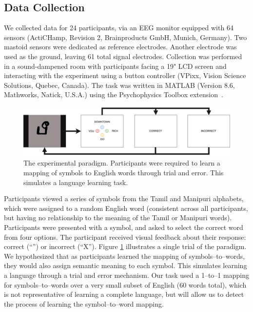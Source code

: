 \subsection{Data Collection}
We collected data for 24 participants, via an EEG monitor equipped with 64 sensors (ActiCHamp, Revision 2, Brainproducts GmbH, Munich, Germany). Two mastoid sensors were dedicated as reference electrodes. Another electrode was used as the ground, leaving 61 total signal electrodes. Collection was performed in a sound-dampened room with participants facing a 19" LCD screen and interacting with the experiment using a button controller (VPixx, Vision Science Solutions, Quebec, Canada). The task was written in MATLAB (Version 8.6, Mathworks, Natick, U.S.A.) using the Psychophysics Toolbox extension~\cite{brainard1997psychophysics}.

\begin{figure}[t]
  \centering
  \includegraphics[width=\linewidth]{figures/experiment}
  \caption{The experimental paradigm. Participants were required to learn a mapping of symbols to English words through trial and error. This simulates a language learning task.}
  \label{fig:experiment}
\end{figure}

Participants viewed a series of symbols from the Tamil and Manipuri alphabets, which were assigned to a random English word (consistent across all participants, but having no relationship to the meaning of the Tamil or Manipuri words).  Participants were presented with a symbol, and asked to select the correct word from four options. The participant received visual feedback about their response: correct (``\CheckmarkBold'') or incorrect (``X''). Figure \ref{fig:experiment} illustrates a single trial of the paradigm. We hypothesized that as participants learned the mapping of symbols--to--words, they would also assign semantic meaning to each symbol. This simulates learning a language through a trial and error mechanism. Our task used a 1--to--1 mapping for symbols--to--words over a very small subset of English (60 words total), which is not representative of learning a complete language, but will allow us to detect the process of learning the symbol--to--word mapping.
  
